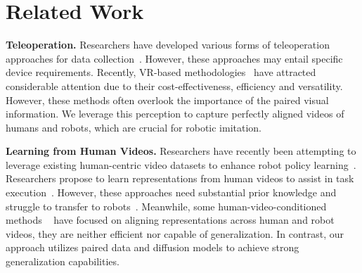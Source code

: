 \section{Related Work}
\label{sec:realted_work}

\noindent\textbf{Teleoperation.} 
Researchers have developed various forms of teleoperation approaches for data collection~\cite{liu2023libero, DexPilot,sivakumar2022robotic,qin2023anyteleop,song2020grasping, arunachalam2022dexterous, arunachalam2023holo, MVP, george2023openvr, zhao2023learning, fu2024mobile, aloha2team2024aloha2enhancedlowcost}.
 However, these approaches may entail specific device requirements. Recently, VR-based methodologies~\cite{iyer2024open, ding2024bunny} have attracted considerable attention due to their cost-effectiveness, efficiency and versatility.
 However, these methods often overlook the importance of the paired visual information. We leverage this perception to capture perfectly aligned videos of humans and robots, which are crucial for robotic imitation.
 
\vspace{0.1cm}
\noindent\textbf{Learning from Human Videos.}
Researchers have recently been attempting to leverage existing human-centric video datasets to enhance robot policy learning~\cite{liu2018imitation, smith2020avid, chen2021learning, videodex, zeng2024learning}. Researchers propose to learn representations from human videos to assist in task execution~\cite{xiao2022masked, wang2023mimicplay, majumdar2024searchartificialvisualcortex}. However, these approaches need substantial prior knowledge and struggle to transfer to robots~\cite{nair2022rm, bahl2023affordances, bahl2022human}. Meanwhile, some human-video-conditioned methods ~\cite{gen2act, jain2024vid2robot, xu2023xskill} have focused on aligning representations across human and robot videos, they are neither efficient nor capable of generalization. In contrast, our approach utilizes paired data and diffusion models to achieve strong generalization capabilities. 

